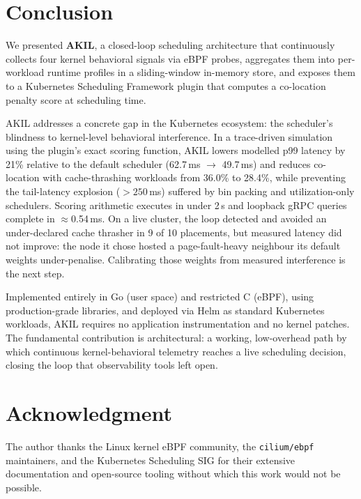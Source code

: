 \documentclass[10pt,conference,a4paper]{IEEEtran}
\begin{document}
\section{Conclusion}
\label{sec:conclusion}

We presented \textbf{AKIL}, a closed-loop scheduling architecture that continuously
collects four kernel behavioral signals via eBPF probes, aggregates them into
per-workload runtime profiles in a sliding-window in-memory store, and exposes them
to a Kubernetes Scheduling Framework plugin that computes a co-location penalty score
at scheduling time.

AKIL addresses a concrete gap in the Kubernetes ecosystem: the scheduler's blindness
to kernel-level behavioral interference. In a trace-driven simulation using the
plugin's exact scoring function, AKIL lowers modelled p99 latency by 21\% relative to
the default scheduler (62.7\,ms $\to$ 49.7\,ms) and reduces co-location with
cache-thrashing workloads from 36.0\% to 28.4\%, while preventing the tail-latency
explosion ($>250$\,ms) suffered by bin packing and utilization-only schedulers.
Scoring arithmetic executes in under 2\,\textmu s and loopback gRPC queries complete
in $\approx$0.54\,ms. On a live cluster, the loop detected and avoided an under-declared
cache thrasher in 9 of 10 placements, but measured latency did not improve: the node it
chose hosted a page-fault-heavy neighbour its default weights under-penalise. Calibrating
those weights from measured interference is the next step.

Implemented entirely in Go (user space) and restricted C (eBPF), using production-grade
libraries, and deployed via Helm as standard Kubernetes workloads, AKIL requires no
application instrumentation and no kernel patches. The fundamental contribution is
architectural: a working, low-overhead path by which continuous kernel-behavioral telemetry
reaches a live scheduling decision, closing the loop that observability tools left open.

\section*{Acknowledgment}

The author thanks the Linux kernel eBPF community, the \texttt{cilium/ebpf}
maintainers, and the Kubernetes Scheduling SIG for their extensive documentation
and open-source tooling without which this work would not be possible.
\end{document}
